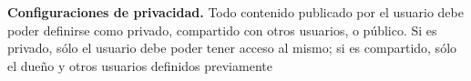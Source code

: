                                  \item \textbf{Configuraciones de privacidad.}
                             Todo contenido publicado por el usuario debe poder definirse como privado,
                             compartido con otros usuarios, o público. Si es privado, sólo el usuario debe poder tener acceso al
                             mismo; si es compartido, sólo el dueño y otros usuarios definidos previamente
